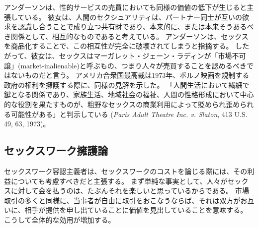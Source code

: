 \documentclass[paper=a4,book,openany]{jlreq}
\newcommand{\ig}[1]{}           %
\begin{document}
アンダーソン\ig{Elizabeth Anderson}は、性的サービスの売買においても同様の価値の低下が生じると主張している。
彼女は、人間のセクシュアリティは、パートナー同士が互いの欲求を認識し合うことで成り立つ共有財であり、本来的に、または本来そうあるべき関係として、相互的なものであると考えている。
アンダーソンは、セックスを商品化することで、この相互性が完全に破壊されてしまうと指摘する\citep[p.154]{anderson93:_value_ethic_econom}。
したがって、彼女は、セックスはマーガレット・ジェーン・ラディンが「市場不可譲」(market-inalienable)と呼ぶもの、つまり人々が売買することを認めるべきではないものだと言う\citep{radin87:_market_inalien,radin00:_contes_commod,satz10:_why_some_thing_shoul_not_be_sale}。
アメリカ合衆国最高裁は1973年、ポルノ映画を規制する政府の権利を擁護する際に、同様の見解を示した。
「人間生活において繊細で鍵となる関係であり、家族生活、地域社会の福祉、人間の性格形成において中心的な役割を果たすものが、粗野なセックスの商業利用によって貶められ歪められる可能性がある」と判示している
(\emph{Paris Adult Theatre Inc. v. Slaton}, 413 U.S. 49, 63, 1973)。

\subsection{セックスワーク擁護論}

セックスワーク容認主義者は、セックスワークのコストを論じる際には、その利益についても考慮すべきだと主張する。
まず単純な事実として、人々がセックスに対して金を払うのは、たぶんそれを楽しいと思っているからである。
市場取引の多くと同様に、当事者が自由に取引をおこなうならば、それは双方がお互いに、相手が提供を申し出ていることに価値を見出していることを意味する。
こうして全体的な効用が増加する。
\end{document}
